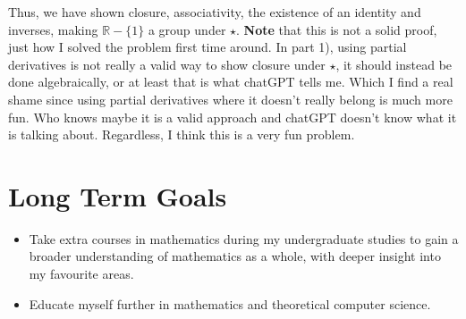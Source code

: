 \documentclass{article}
\begin{document}
Thus, we have shown closure, associativity, the existence of an identity and inverses, making \( \mathbb{R} - \{1\}\) a group under \( \star \).
\textbf{Note} that this is not a solid proof, just how I solved the problem 
first time around. 
In part 1), using partial derivatives is not really a valid way
to show closure under \(\star\), it should instead be done algebraically, 
or at least that is what chatGPT tells me.  
Which I find a real shame since using partial derivatives where it doesn't 
really belong is much more fun.
Who knows maybe it is a valid approach and chatGPT doesn't know what 
it is talking about. Regardless, I think this is a very fun problem.

\break
\section{Long Term Goals}
\begin{itemize}
  \item Take extra courses in mathematics during my undergraduate studies 
      to gain a broader understanding of mathematics as a whole, with 
      deeper insight into my favourite areas.
  \item Educate myself further in mathematics and theoretical computer science.
\end{itemize}
\end{document}
